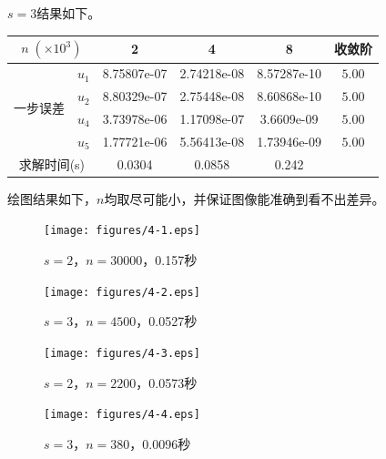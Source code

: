 \documentclass[lang=cn,10pt,bibend=bibtex]{elegantbook}
\begin{document}
$s=3$结果如下。

\vspace{-.5em}
\begin{table}[H]
  \centering
  \renewcommand\arraystretch{0.8}
  \begin{tabular}{cc|ccc|c}
  \multicolumn{2}{c|}{$n\;(\times 10^3)$}           &              2 & 4 & 8  & 收敛阶 \\ \hline
  \multicolumn{1}{c|}{\multirow{4}{*}{一步误差}}    & \multicolumn{1}{c|}{$u_1$}  & 8.75807e-07  & 2.74218e-08  & 8.57287e-10   &   $5.00$  \\
  \multicolumn{1}{c|}{}                         & \multicolumn{1}{c|}{$u_2$}  & 8.80329e-07  & 2.75448e-08  & 8.60868e-10   &  $5.00$   \\
  \multicolumn{1}{c|}{}                         & \multicolumn{1}{c|}{$u_4$}  & 3.73978e-06  & 1.17098e-07  & 3.6609e-09   & $5.00$ \\
  \multicolumn{1}{c|}{}                         & \multicolumn{1}{c|}{$u_5$}  & 1.77721e-06  & 5.56413e-08  & 1.73946e-09   & $5.00$  \\ \hline
  \multicolumn{2}{c|}{求解时间(s)} & 0.0304 & 0.0858 & 0.242 & 
  \end{tabular}
\end{table}
\vspace{-.5em}

绘图结果如下，$n$均取尽可能小，并保证图像能准确到看不出差异。

\begin{figure}[H]
  \centering
  \begin{minipage}[t]{0.32\linewidth}
      \centering
      \texttt{[image: figures/4-1.eps]}
      \caption*{\small $s=2$，$n=30000$，0.157秒}
  \end{minipage}
  \hspace{1em}
  \begin{minipage}[t]{0.32\linewidth}
      \centering
      \texttt{[image: figures/4-2.eps]}
      \caption*{\small $s=3$，$n=4500$，0.0527秒}
  \end{minipage}
\end{figure}

\begin{figure}[H]
  \centering
  \begin{minipage}[t]{0.32\linewidth}
      \centering
      \texttt{[image: figures/4-3.eps]}
      \caption*{\small $s=2$，$n=2200$，0.0573秒}
  \end{minipage}
  \hspace{1em}
  \begin{minipage}[t]{0.32\linewidth}
    \centering
    \texttt{[image: figures/4-4.eps]}
    \caption*{\small $s=3$，$n=380$，0.0096秒}
  \end{minipage}
\end{figure}
\end{document}
